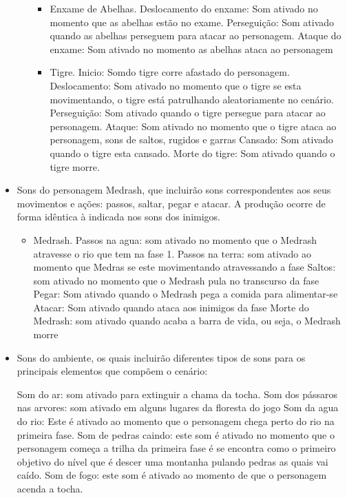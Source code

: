\begin{itemize}
\begin{itemize}
\begin{itemize}
\item Enxame de Abelhas.
\subitem Deslocamento do enxame: Som ativado no momento que as abelhas estão 
no exame.
\subitem Perseguição: Som ativado quando as abelhas perseguem para atacar 
ao personagem.
\subitem Ataque do enxame: Som ativado no momento as abelhas ataca ao personagem
\end{itemize}

\begin{itemize}
\item Tigre.
\subitem Inicio: Somdo tigre corre afastado do personagem. 
\subitem Deslocamento: Som ativado no momento que o tigre se esta movimentando, 
o tigre está patrulhando aleatoriamente no cenário.
\subitem Perseguição: Som ativado quando o tigre persegue para atacar 
ao personagem.
\subitem Ataque: Som ativado no momento que o tigre ataca ao personagem, 
sons de saltos, rugidos e garras  
\subitem Cansado: Som ativado quando o tigre esta cansado.
\subitem Morte do tigre: Som ativado quando o tigre morre.
\end{itemize}



\end{itemize}

\item Sons do personagem Medrash, que incluirão sons correspondentes
 aos seus movimentos e ações: passos, saltar, pegar e atacar. A
 produção ocorre de forma idêntica à indicada nos sons dos inimigos.

\begin{itemize}
\item Medrash.
\subitem Passos na agua: som ativado no momento que o Medrash atravesse o rio 
que tem na fase 1. 
\subitem Passos na terra: som ativado ao momento que Medras se este movimentando 
atravessando a fase 
\subitem Saltos: som ativado no momento que o Medrash pula no transcurso da fase
\subitem Pegar: Som ativado quando o Medrash pega a comida para alimentar-se
\subitem Atacar: Som ativado quando ataca aos inimigos da fase
\subitem Morte do Medrash: som ativado quando acaba a barra de vida, 
ou seja, o Medrash morre
\end{itemize}

\item Sons do ambiente, os quais incluirão diferentes tipos de sons para os
principais elementos que compõem o cenário:
\begin{itemize}
\subitem Som do ar: som ativado para extinguir a chama da tocha. 
\subitem Som dos pássaros nas arvores: som ativado em alguns lugares da floresta 
do jogo 
\subitem Som da agua do rio: Este é ativado ao momento que o personagem chega 
perto do rio na primeira fase.
\subitem Som de pedras caindo: este som é ativado no momento que o personagem 
começa a trilha da primeira fase é se encontra como o primeiro objetivo do 
nível que é descer uma montanha pulando pedras as quais vai caído.
\subitem Som de fogo: este som  é ativado ao momento de que o personagem 
acenda a tocha.
\end{itemize}


\end{itemize}
